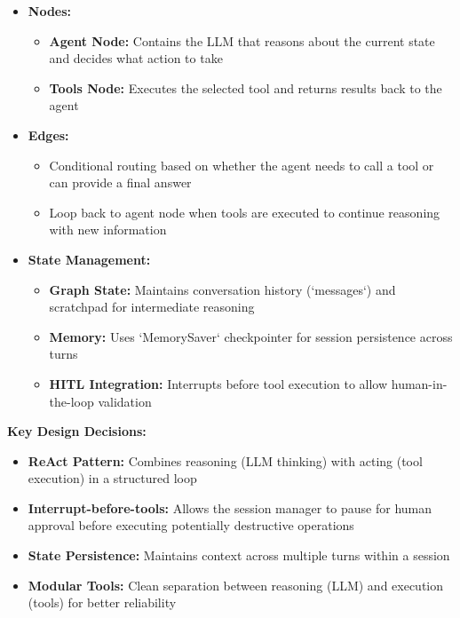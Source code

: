 \documentclass[12pt, a4paper]{article}
\begin{document}
\begin{itemize}
    \item \textbf{Nodes:} 
    \begin{itemize}
        \item \textbf{Agent Node:} Contains the LLM that reasons about the current state and decides what action to take
        \item \textbf{Tools Node:} Executes the selected tool and returns results back to the agent
    \end{itemize}
    
    \item \textbf{Edges:} 
    \begin{itemize}
        \item Conditional routing based on whether the agent needs to call a tool or can provide a final answer
        \item Loop back to agent node when tools are executed to continue reasoning with new information
    \end{itemize}
    
    \item \textbf{State Management:} 
    \begin{itemize}
        \item \textbf{Graph State:} Maintains conversation history (`messages`) and scratchpad for intermediate reasoning
        \item \textbf{Memory:} Uses `MemorySaver` checkpointer for session persistence across turns
        \item \textbf{HITL Integration:} Interrupts before tool execution to allow human-in-the-loop validation
    \end{itemize}
\end{itemize}

\textbf{Key Design Decisions:}
\begin{itemize}
    \item \textbf{ReAct Pattern:} Combines reasoning (LLM thinking) with acting (tool execution) in a structured loop
    \item \textbf{Interrupt-before-tools:} Allows the session manager to pause for human approval before executing potentially destructive operations
    \item \textbf{State Persistence:} Maintains context across multiple turns within a session
    \item \textbf{Modular Tools:} Clean separation between reasoning (LLM) and execution (tools) for better reliability
\end{itemize}
\end{document}
